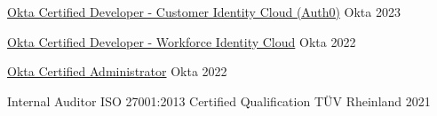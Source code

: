 	{}
	{}

\begin{cvhonors}
	
	\cvhonor
	{\href{https://www.credly.com/badges/4be42262-e507-4017-9f94-5362219eb806}{Okta Certified Developer - Customer Identity Cloud (Auth0)}} %
	{Okta} %
	{} %
	{2023} %
	
	\cvhonor
	{\href{https://www.credly.com/badges/1718b5fb-7b66-44a2-9268-f15f3f1645fa}{Okta Certified Developer - Workforce Identity Cloud}} %
	{Okta} %
	{} %
	{2022} %
	
	\cvhonor
	{\href{https://www.credly.com/badges/cb47093d-90c5-47df-9d0d-486eac4c2fd4}{Okta Certified Administrator}} %
	{Okta} %
	{} %
	{2022} %

	\cvhonor
	{Internal Auditor ISO 27001:2013 Certified Qualification} %
	{TÜV Rheinland } %
	{} %
	{2021} %
	
\end{cvhonors}
